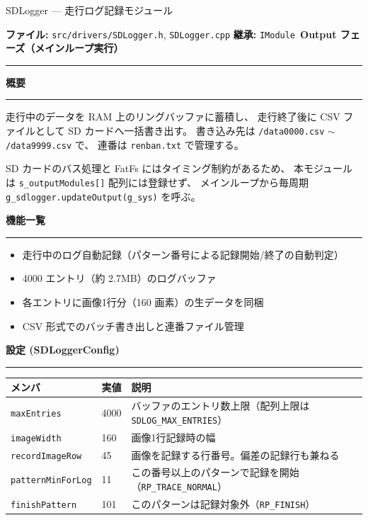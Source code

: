 \documentclass[a4paper,11pt,dvipdfmx]{jsarticle}
\makeatletter
\newcommand{\apisection}[1]{%
  \par\addvspace{4mm}%
  {\normalsize\bfseries\color{headerblue} #1}%
  \par\vspace{-1mm}%
  {\color{accentblue!40}\rule{\linewidth}{0.5pt}}%
  \par\nobreak\vspace{2mm}%
  \@afterheading
}
\newcommand{\phasebadge}[1]{%
  \colorbox{accentblue!10}{\small\bfseries\color{accentblue!80!black}\,#1\,}%
}
\makeatother
\begin{document}
\begin{apibox}{SDLogger --- 走行ログ記録モジュール}

\textbf{ファイル:} \texttt{src/drivers/SDLogger.h}, \texttt{SDLogger.cpp} \hfill
\textbf{継承:} \texttt{IModule} \hfill
\phasebadge{Output フェーズ（メインループ実行）}

\vspace{2mm}\hrule\vspace{2mm}

\apisection{概要}

走行中のデータを RAM 上のリングバッファに蓄積し、
走行終了後に CSV ファイルとして SD カードへ一括書き出す。
書き込み先は \texttt{/data0000.csv} $\sim$ \texttt{/data9999.csv} で、
連番は \texttt{renban.txt} で管理する。

\begin{cautionbox}
SD カードのバス処理と FatFs にはタイミング制約があるため、
本モジュールは \texttt{s\_outputModules[]} 配列には登録せず、
メインループから毎周期 \texttt{g\_sdlogger.updateOutput(g\_sys)} を呼ぶ。
\end{cautionbox}

\apisection{機能一覧}

\begin{itemize}[nosep]
  \item 走行中のログ自動記録（パターン番号による記録開始/終了の自動判定）
  \item 4000 エントリ（約 2.7MB）のログバッファ
  \item 各エントリに画像1行分（160 画素）の生データを同梱
  \item CSV 形式でのバッチ書き出しと連番ファイル管理
\end{itemize}

\apisection{設定 (SDLoggerConfig)}

\begin{tabularx}{\textwidth}{l l X}
\toprule
\textbf{メンバ} & \textbf{実値} & \textbf{説明} \\
\midrule
\texttt{maxEntries}       & 4000 & バッファのエントリ数上限（配列上限は \texttt{SDLOG\_MAX\_ENTRIES}） \\
\texttt{imageWidth}       & 160  & 画像1行記録時の幅 \\
\texttt{recordImageRow}   & 45   & 画像を記録する行番号。偏差の記録行も兼ねる \\
\texttt{patternMinForLog} & 11   & この番号以上のパターンで記録を開始（\texttt{RP\_TRACE\_NORMAL}） \\
\texttt{finishPattern}    & 101  & このパターンは記録対象外（\texttt{RP\_FINISH}） \\
\bottomrule
\end{tabularx}


\end{apibox}
\end{document}
